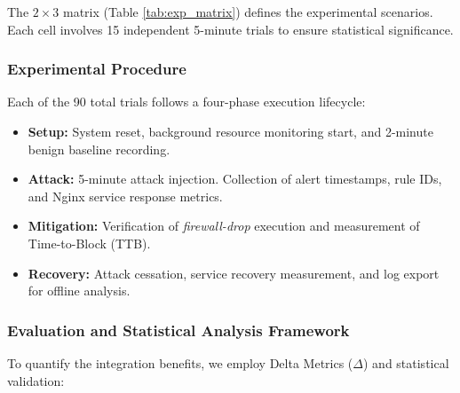 The $2 \times 3$ matrix (Table \ref{tab:exp_matrix}) defines the experimental scenarios. Each cell involves 15 independent 5-minute trials to ensure statistical significance.

\begin{table}[h]
\centering
\caption{$2 \times 3$ Experimental Design Matrix}
\label{tab:exp_matrix}
\end{table}

\subsubsection{Experimental Procedure}

Each of the 90 total trials follows a four-phase execution lifecycle:
\begin{itemize}
    \item \textbf{Setup:} System reset, background resource monitoring start, and 2-minute benign baseline recording.
    \item \textbf{Attack:} 5-minute attack injection. Collection of alert timestamps, rule IDs, and Nginx service response metrics.
    \item \textbf{Mitigation:} Verification of \textit{firewall-drop} execution and measurement of Time-to-Block (TTB).
    \item \textbf{Recovery:} Attack cessation, service recovery measurement, and log export for offline analysis.
\end{itemize}

\subsubsection{Evaluation and Statistical Analysis Framework}

To quantify the integration benefits, we employ Delta Metrics ($\Delta$) and statistical validation:

